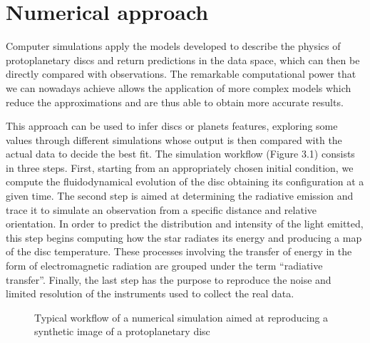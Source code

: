 \documentclass[a4paper,10pt]{report}
\begin{document}
\section{Numerical approach}

Computer simulations apply the models developed to describe the physics of protoplanetary discs 
and return predictions in the data space, which can then be directly compared with observations.
The remarkable computational power that we can nowadays achieve allows the application of
more complex models which reduce the approximations and are thus able to obtain more 
accurate results.

This approach can be used to infer discs or planets features, exploring some values through different simulations
whose output is then compared with the actual data to decide the best fit.
The simulation workflow (Figure 3.1) consists in three steps. 
First, starting from an appropriately chosen initial condition,
we compute the fluidodynamical evolution of the disc obtaining its configuration
at a given time. The second step is aimed at determining the radiative emission and trace it 
to simulate an observation from a specific distance and relative orientation.
In order to predict the distribution and intensity of the light emitted, this step begins computing
how the star radiates its energy and producing a map of the disc temperature. These processes involving the
transfer of energy in the form of electromagnetic radiation are grouped under the term ``radiative transfer''.
Finally, the last step has the purpose to reproduce the noise and limited resolution of the instruments 
used to collect the real data.

\begin{figure}
    \begin{center}
        
    \end{center}
    \caption{Typical workflow of a numerical simulation
     aimed at reproducing a synthetic image of a protoplanetary disc}
\end{figure}
\end{document}
